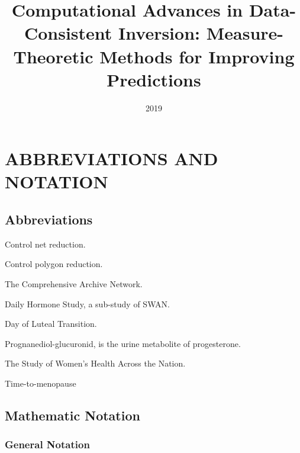 \documentclass[english,10pt]{ucdenver-dissertation}
\title{Computational Advances in Data-Consistent Inversion: Measure-Theoretic Methods for Improving Predictions}
\date{2019}
\begin{document}
%
%
%
%
%

\renewcommand\bibname{REFERENCES}
\singlespacing

\nocite{*}



\doublespacing

\ucdappendix

\chapter{\uppercase{Abbreviations and Notation} \label{appendix-notation}}

\section{Abbreviations}

\begin{description}[leftmargin=!,labelwidth=0.5in,font=\normalfont]
  \item[CNR]  Control net reduction.
  \item[CPR]  Control polygon reduction.
  \item[CRAN] The Comprehensive  Archive Network.
  \item[DHS]  Daily Hormone Study, a sub-study of SWAN.
  \item[DLT]  Day of Luteal Transition.
  \item[PDG]  Prognanediol-glucuronid, is the urine metabolite of progesterone.
  \item[SWAN] The Study of Women's Health Across the Nation.  
  \item[TTM]  Time-to-menopause
\end{description}

\section{Mathematic Notation}

\subsection{General Notation}
\end{document}

